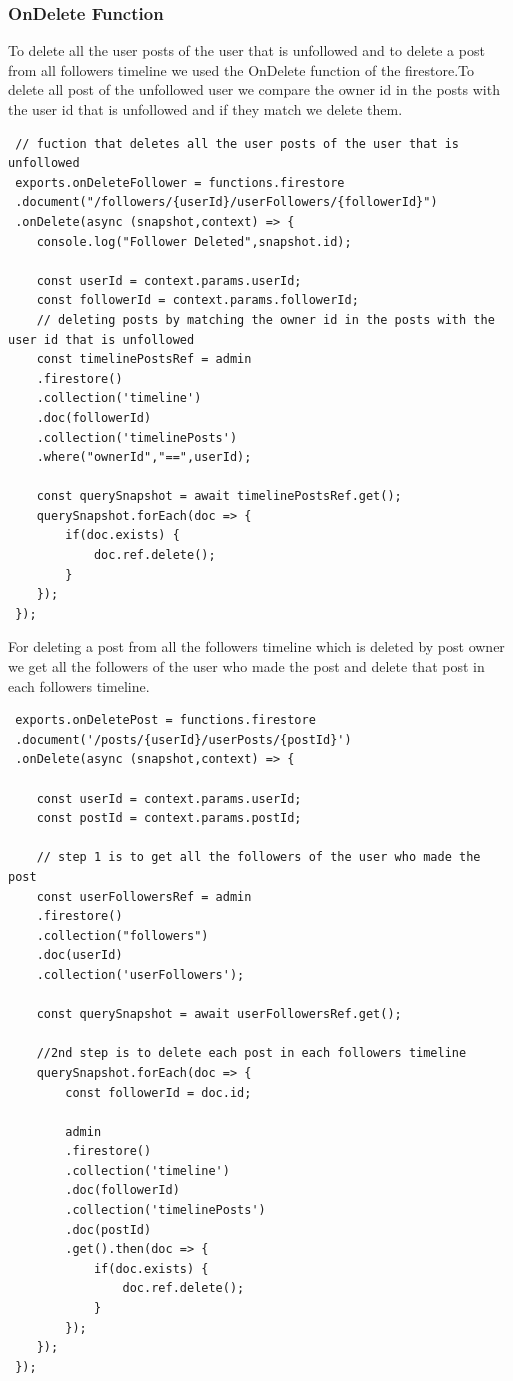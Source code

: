 \subsubsection{OnDelete Function}
To delete all the user posts of the user that is unfollowed and to delete a post from all followers timeline we used the OnDelete function of the firestore.To delete all post of the unfollowed user we compare the owner id in the posts with the user id that is unfollowed and if they match we delete them.
\begin{verbatim}
 // fuction that deletes all the user posts of the user that is unfollowed
 exports.onDeleteFollower = functions.firestore
 .document("/followers/{userId}/userFollowers/{followerId}")
 .onDelete(async (snapshot,context) => {
    console.log("Follower Deleted",snapshot.id);

    const userId = context.params.userId;
    const followerId = context.params.followerId;
    // deleting posts by matching the owner id in the posts with the user id that is unfollowed
    const timelinePostsRef = admin
    .firestore()
    .collection('timeline')
    .doc(followerId)
    .collection('timelinePosts')
    .where("ownerId","==",userId);

    const querySnapshot = await timelinePostsRef.get();
    querySnapshot.forEach(doc => {
        if(doc.exists) {
            doc.ref.delete();
        }
    });
 });
\end{verbatim}
For deleting a post from all the followers timeline which is deleted by post owner we get all the followers of the user who made the post and delete that post in each followers timeline.
\begin{verbatim}
 exports.onDeletePost = functions.firestore
 .document('/posts/{userId}/userPosts/{postId}')
 .onDelete(async (snapshot,context) => {

    const userId = context.params.userId;
    const postId = context.params.postId;

    // step 1 is to get all the followers of the user who made the post
    const userFollowersRef = admin
    .firestore()
    .collection("followers")
    .doc(userId)
    .collection('userFollowers');

    const querySnapshot = await userFollowersRef.get();

    //2nd step is to delete each post in each followers timeline
    querySnapshot.forEach(doc => {
        const followerId = doc.id;

        admin
        .firestore()
        .collection('timeline')
        .doc(followerId)
        .collection('timelinePosts')
        .doc(postId)
        .get().then(doc => {
            if(doc.exists) {
                doc.ref.delete();
            }
        });
    });
 });
\end{verbatim}
